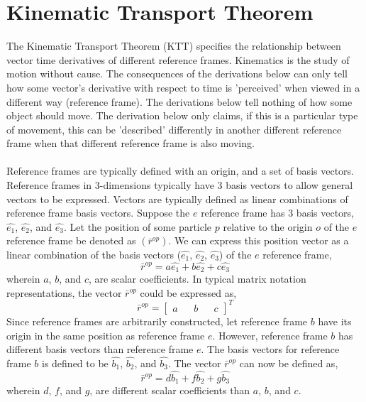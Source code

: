 
\chapter{Kinematic Transport Theorem}
\begin{comment}
\end{comment}
The Kinematic Transport Theorem (KTT) specifies the relationship between vector time derivatives of different reference frames. 
Kinematics is the study of motion without cause. 
The consequences of the derivations below can only tell how some vector's derivative with respect to time is 'perceived' when viewed in a different way (reference frame). 
The derivations below tell nothing of how some object should move. 
The derivation below only claims, if this is a particular type of movement, this can be 'described' differently in another different reference frame when that different reference frame is also moving.
\\~\\Reference frames are typically defined with an origin, and a set of basis vectors. 
Reference frames in $3$-dimensions typically have $3$ basis vectors to allow general vectors to be expressed. 
Vectors are typically defined as linear combinations of reference frame basis vectors. 
Suppose the $e$ reference frame has $3$ basis vectors, $\hat{e_{1}}$, $\hat{e_{2}}$, and $\hat{e_{3}}$. 
Let the position of some particle $p$ relative to the origin $o$ of the $e$ reference frame be denoted as $\left(\bar{r}^{op}\right)$.
We can express this position vector as a linear combination of the basis vectors ($\hat{e_{1}}$, $\hat{e_{2}}$, $\hat{e_{3}}$) of the $e$ reference frame, 
$$\bar{r}^{op} = a\hat{e_{1}} + b\hat{e_{2}} + c\hat{e_{3}}$$
wherein $a$, $b$, and $c$, are scalar coefficients. 
In typical matrix notation representations, the vector $\bar{r}^{op}$ could be expressed as,
$$\bar{r}^{op} = \begin{bmatrix}
a && b && c
\end{bmatrix}^{T}$$
Since reference frames are arbitrarily constructed, let reference frame $b$ have its origin in the same position as reference frame $e$. 
However, reference frame $b$ has different basis vectors than reference frame $e$. 
The basis vectors for reference frame $b$ is defined to be $\hat{b_{1}}$, $\hat{b_{2}}$, and $\hat{b_{3}}$. 
The vector $\bar{r}^{op}$ can now be defined as,
$$\bar{r}^{op} = d\hat{b_{1}} + f\hat{b_{2}} + g\hat{b_{3}}$$
wherein $d$, $f$, and $g$, are different scalar coefficients than $a$, $b$, and $c$. 
